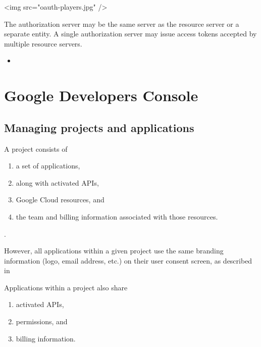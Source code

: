 \begin{rawhtml}
<img src="oauth-players.jpg" />
\end{rawhtml}

The authorization server
may be the same server as the resource server or a separate entity.
A single authorization server may issue access tokens accepted by
multiple resource servers.

\begin{itemize}
\item
{}
\end{itemize}

\section{Google Developers Console}

\subsection{Managing projects and applications}

A project consists of 
\begin{enumerate}
\item
a set of applications, 
\item
along with activated APIs,
\item
Google Cloud resources, and 
\item
the team and billing information associated
with those resources.
\end{enumerate}
. 

However, all applications within a given project use the same
branding information (logo, email address, etc.) on their user consent
screen, as described in 

Applications within a
project also share 
\begin{enumerate}
\item
activated APIs, 
\item
permissions, and 
\item
billing information.
\end{enumerate}


